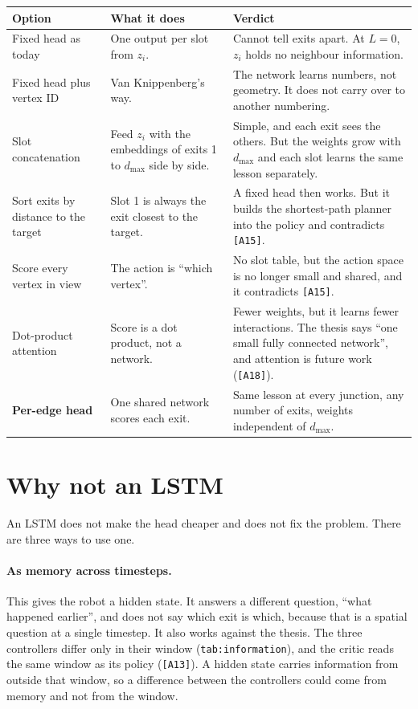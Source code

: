 \documentclass[11pt,a4paper]{article}
\begin{document}
\begin{center}
\small
\begin{tabular}{@{}p{3.4cm}p{4.8cm}p{6.8cm}@{}}
\toprule
Option & What it does & Verdict \\
\midrule
Fixed head as today &
  One output per slot from $z_i$. &
  Cannot tell exits apart. At $L=0$, $z_i$ holds no neighbour information. \\[3pt]
Fixed head plus vertex ID &
  Van Knippenberg's way. &
  The network learns numbers, not geometry. It does not carry over to another numbering. \\[3pt]
Slot concatenation &
  Feed $z_i$ with the embeddings of exits 1 to $d_{\max}$ side by side. &
  Simple, and each exit sees the others. But the weights grow with $d_{\max}$ and each slot learns the same lesson separately. \\[3pt]
Sort exits by distance to the target &
  Slot 1 is always the exit closest to the target. &
  A fixed head then works. But it builds the shortest-path planner into the policy and contradicts \texttt{[A15]}. \\[3pt]
Score every vertex in view &
  The action is ``which vertex''. &
  No slot table, but the action space is no longer small and shared, and it contradicts \texttt{[A15]}. \\[3pt]
Dot-product attention &
  Score is a dot product, not a network. &
  Fewer weights, but it learns fewer interactions. The thesis says ``one small fully connected network'', and attention is future work (\texttt{[A18]}). \\[3pt]
\textbf{Per-edge head} &
  One shared network scores each exit. &
  Same lesson at every junction, any number of exits, weights independent of $d_{\max}$. \\
\bottomrule
\end{tabular}
\end{center}

\section{Why not an LSTM}
\label{sec:lstm}

An LSTM does not make the head cheaper and does not fix the problem. There
are three ways to use one.

\paragraph{As memory across timesteps.} This gives the robot a hidden
state. It answers a different question, ``what happened earlier'', and does
not say which exit is which, because that is a spatial question at a single
timestep. It also works against the thesis. The three controllers differ
only in their window (\texttt{tab:information}), and the critic reads the
same window as its policy (\texttt{[A13]}). A hidden state carries
information from outside that window, so a difference between the
controllers could come from memory and not from the window.
\end{document}
